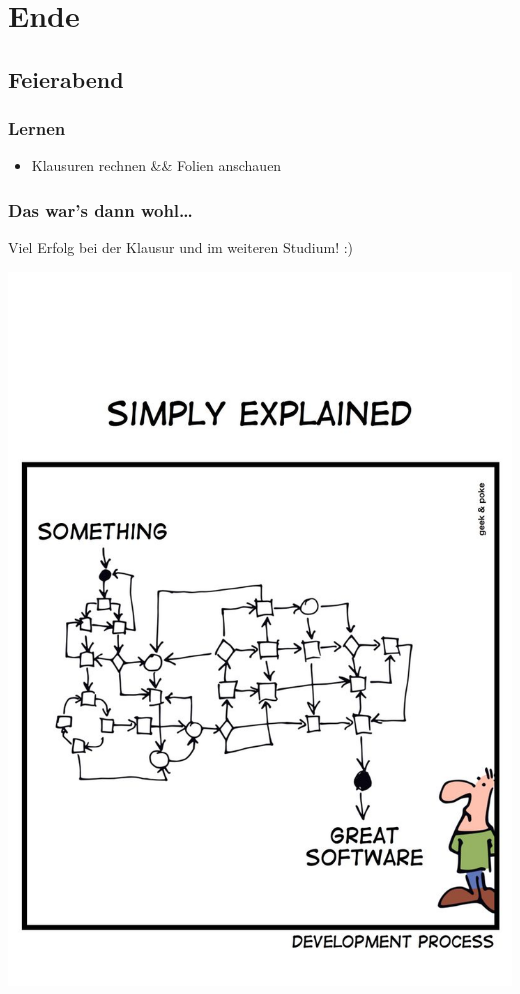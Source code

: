 \documentclass[18pt]{beamer}
\begin{document}
\section{Ende}
	\subsection{Feierabend}
	\begin{frame}
		\frametitle{Lernen}
		\begin{itemize}
			\item Klausuren rechnen \&\& Folien anschauen
		\end{itemize}
	\end{frame}

	\begin{frame}
		\frametitle{Das war's dann wohl\dots}
		\centering
		\begin{large}
			Viel Erfolg bei der Klausur und im weiteren Studium! :)
		\end{large}
		\linebreak
		\includegraphics[scale=0.75]{./comics/geek_and_poke_development2.jpg}
	\end{frame}
\end{document}
